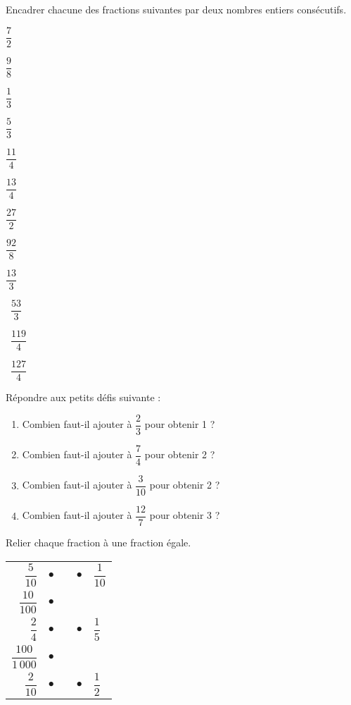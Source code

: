 \begin{colonne*exercice}
\medskip

\begin{exercice}
   Encadrer chacune des fractions suivantes par deux nombres entiers consécutifs. \medskip
    \begin{colenumerate}{3}
      \item $\dfrac72$ \bigskip
      \item $\dfrac98$ \bigskip
      \item $\dfrac13$ \bigskip
      \item $\dfrac53$ \bigskip
      \item $\dfrac{11}{4}$
      \item $\dfrac{13}{4}$
      \item $\dfrac{27}2$
      \item $\dfrac{92}8$
      \item $\dfrac{13}{3}$
      \item \, $\dfrac{53}{3}$
      \item \, $\dfrac{119}{4}$
      \item \, $\dfrac{127}{4}$
   \end{colenumerate}
\end{exercice}

\medskip

\begin{exercice}
   Répondre aux petits défis suivante : \medskip
   \begin{enumerate}
      \item Combien faut-il ajouter à $\dfrac23$ pour obtenir 1 ? \bigskip
      \item Combien faut-il ajouter à $\dfrac74$ pour obtenir 2 ? \bigskip
      \item Combien faut-il ajouter à $\dfrac3{10}$ pour obtenir 2 ? \bigskip
      \item Combien faut-il ajouter à $\dfrac{12}7$ pour obtenir 3 ? \bigskip
   \end{enumerate}
\end{exercice}

\medskip

\begin{exercice}
   Relier chaque fraction à une fraction égale. \\ [2mm]
   \begin{tabular}{rcp{2cm}cp{2cm}}
      $\dfrac{5}{10}$ & $\bullet$ & & $\bullet$ & $\dfrac{1}{10}$ \\ [4mm]
      $\dfrac{10}{100}$ & $\bullet$ & & & \\ [4mm]
      $\dfrac{2}{4}$ & $\bullet$ & & $\bullet$ & $\dfrac{1}{5}$ \\ [4mm]
      $\dfrac{100}{1\,000}$ & $\bullet$ & & & \\ [4mm]
      $\dfrac{2}{10}$ & $\bullet$ & & $\bullet$ & $\dfrac{1}{2}$ \\
   \end{tabular}
\end{exercice} 

\end{colonne*exercice}


